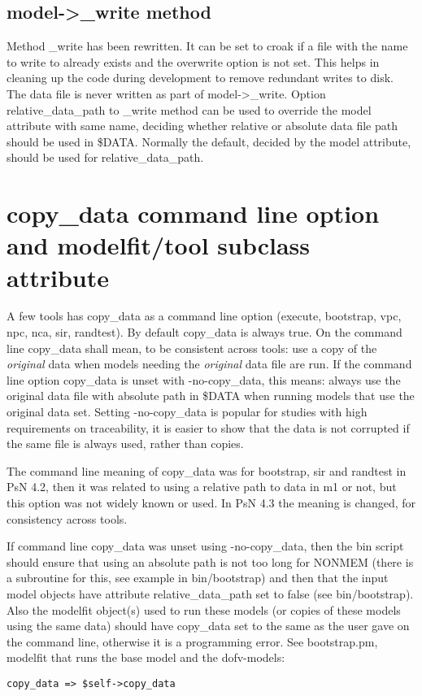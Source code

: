 \subsection{model->\_write method}
Method \_write has been rewritten. 
It can be set to croak if a file with the name to write to already exists and the overwrite option is not set. This
helps in cleaning up the code during development
to remove redundant writes to disk.
The data file is never written as part of model->\_write.
Option relative\_data\_path to \_write method can be used to override the model attribute with same name,
deciding whether relative or absolute data file path should be used in \$DATA.
Normally the default, decided by the model attribute, should be used for relative\_data\_path.

\section{copy\_data command line option and modelfit/tool subclass attribute}
A few tools has copy\_data as a command line option (execute, bootstrap, vpc, npc, nca, sir, randtest). 
By default copy\_data is always true. On the
command line copy\_data shall mean, to be consistent across tools: 
use a copy of the \emph{original} data when models needing the \emph{original}
data file are run. If the command line option copy\_data is unset with -no-copy\_data, this means: always use the 
original data file with absolute path in \$DATA when running models that use the original data set. Setting -no-copy\_data
is popular for studies with high requirements on traceability, it is easier to show that the data is not corrupted 
if the same file is always used, rather than copies.

The command line meaning of copy\_data was for bootstrap, sir and randtest in PsN 4.2, then it was related to using a relative path to data in m1 or not, but this option was not widely known or used. In PsN 4.3 the meaning is changed, for consistency across tools.

If command line copy\_data was unset using -no-copy\_data, then the bin script should ensure that using an absolute path is not too long for NONMEM (there is a subroutine for this, see example in bin/bootstrap) and then that the input model objects have attribute relative\_data\_path set to false (see bin/bootstrap).
Also the modelfit object(s) used to run these models (or copies of these models using the same data) should have copy\_data set to the same as the user gave on the command line, otherwise it is a programming error. See bootstrap.pm, modelfit that runs the base model and the dofv-models: 
\begin{verbatim}
copy_data => $self->copy_data
\end{verbatim}

